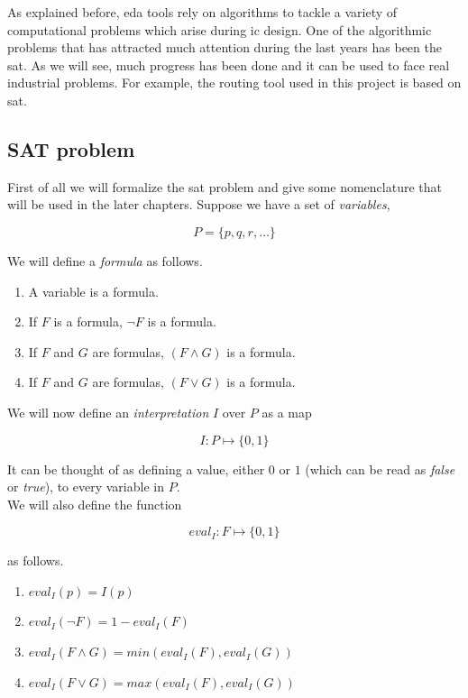 As explained before, \gls{eda} tools rely on algorithms to tackle a variety of computational problems which arise during \gls{ic} design. One of the algorithmic problems that has attracted much attention during the last years has been the \gls{sat}. As we will see, much progress has been done and it can be used to face real industrial problems. For example, the routing tool used in this project is based on \gls{sat}.

\subsection{SAT problem}

First of all we will formalize the \gls{sat} problem and give some nomenclature that will be used in the later chapters. Suppose we have a set of \textit{variables},

\[ P = \{ p, q, r, \ldots \} \] 

We will define a \textit{formula} as follows.

\begin{enumerate}
  \item A variable is a formula.
  \item If $F$ is a formula, $\neg F$ is a formula.
  \item If $F$ and $G$ are formulas, $(F \wedge G)$ is a formula.
  \item If $F$ and $G$ are formulas, $(F \lor G)$ is a formula.
\end{enumerate} 

We will now define an \textit{interpretation} $I$ over $P$ as a map

\[ I \colon P \mapsto \{ 0,1 \} \]

It can be thought of as defining a value, either $0$ or $1$ (which can be read as \textit{false} or \textit{true}), to every variable in $P$. \\

We will also define the function

\[ eval_{I} \colon F \mapsto \{ 0,1 \} \]

as follows.

\begin{enumerate}
  \item $eval_{I}(p) = I(p)$
  \item $eval_{I}(\neg F) = 1 - eval_{I}(F)$
  \item $eval_{I}(F \wedge G) = min(eval_{I}(F), eval_{I}(G))$
  \item $eval_{I}(F \lor G) = max(eval_{I}(F), eval_{I}(G))$
\end{enumerate}

